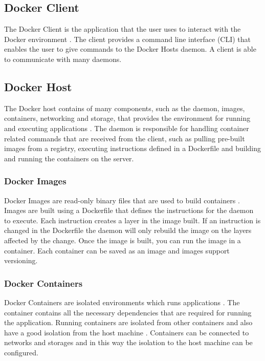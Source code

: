 \documentclass[fleqn,12pt]{olplainarticle}
\begin{document}
\subsection{Docker Client}

The Docker Client is the application that the user uses to interact with the Docker environment \citep{aquasec:docker_architecture}. The client provides a command line interface (CLI) that enables the user to give commands to the Docker Hosts daemon. A client is able to communicate with many daemons.

\subsection{Docker Host}

The Docker host contains of many components, such as the daemon, images, containers, networking and storage, that provides the environment for running and executing applications \citep{aquasec:docker_architecture}. The daemon is responsible for handling container related commands that are received from the client, such as pulling pre-built images from a registry, executing instructions defined in a Dockerfile and building and running the containers on the server.

\subsubsection{Docker Images}

Docker Images are read-only binary files that are used to build containers \citep{docker:overview}. Images are built using a Dockerfile that defines the instructions for the daemon to execute. Each instruction creates a layer in the image built. If an instruction is changed in the Dockerfile the daemon will only rebuild the image on the layers affected by the change. Once the image is built, you can run the image in a container. Each container can be saved as an image and images support versioning.

\subsubsection{Docker Containers}

Docker Containers are isolated environments which runs applications \citep{aquasec:docker_architecture}. The container contains all the necessary dependencies that are required for running the application. Running containers are isolated from other containers and also have a good isolation from the host machine \citep{docker:security}. Containers can be connected to networks and storages and in this way the isolation to the host machine can be configured.
\end{document}
